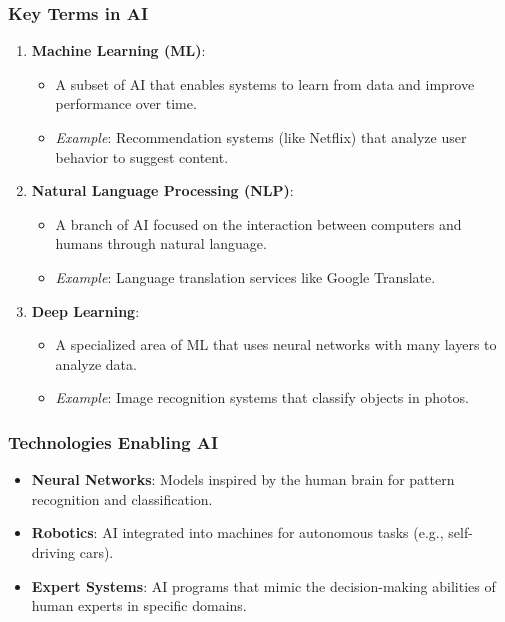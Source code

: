 \documentclass[aspectratio=169]{beamer}
\begin{document}
\begin{frame}[fragile]
    \frametitle{Key Terms in AI}
    \begin{enumerate}
        \item \textbf{Machine Learning (ML)}:
            \begin{itemize}
                \item A subset of AI that enables systems to learn from data and improve performance over time.
                \item \textit{Example}: Recommendation systems (like Netflix) that analyze user behavior to suggest content.
            \end{itemize}
        \item \textbf{Natural Language Processing (NLP)}:
            \begin{itemize}
                \item A branch of AI focused on the interaction between computers and humans through natural language.
                \item \textit{Example}: Language translation services like Google Translate.
            \end{itemize}
        \item \textbf{Deep Learning}:
            \begin{itemize}
                \item A specialized area of ML that uses neural networks with many layers to analyze data.
                \item \textit{Example}: Image recognition systems that classify objects in photos.
            \end{itemize}
    \end{enumerate}
\end{frame}

\begin{frame}[fragile]
    \frametitle{Technologies Enabling AI}
    \begin{itemize}
        \item \textbf{Neural Networks}: Models inspired by the human brain for pattern recognition and classification.
        \item \textbf{Robotics}: AI integrated into machines for autonomous tasks (e.g., self-driving cars).
        \item \textbf{Expert Systems}: AI programs that mimic the decision-making abilities of human experts in specific domains.
    \end{itemize}
\end{frame}
\end{document}
